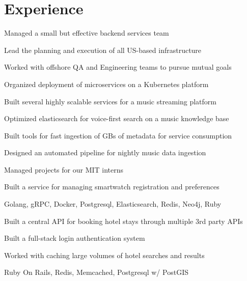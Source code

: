 \documentclass[]{modern}
\begin{document}
\begin{minipage}[t]{0.66\textwidth}


\section{Experience}


\vspace{\topsep} %
\begin{tightemize}
\item Managed a small but effective backend services team
\item Lead the planning and execution of all US-based infrastructure
\item Worked with offshore QA and Engineering teams to pursue mutual goals
\item Organized deployment of microservices on a Kubernetes platform
\end{tightemize}
\sectionsep


\begin{tightemize}
\item Built several highly scalable services for a music streaming platform
\item Optimized elasticsearch for voice-first search on a music knowledge base
\item Built tools for fast ingestion of GBs of metadata for service consumption
\item Designed an automated pipeline for nightly music data ingestion
\item Managed projects for our MIT interns
\item Built a service for managing smartwatch registration and preferences
\item Golang, gRPC, Docker, Postgresql, Elasticsearch, Redis, Neo4j, Ruby
\end{tightemize}
\sectionsep


\begin{tightemize}
\item Built a central API for booking hotel stays through multiple 3rd party APIs
\item Built a full-stack login authentication system
\item Worked with caching large volumes of hotel searches and results
\item Ruby On Rails, Redis, Memcached, Postgresql w/ PostGIS
\end{tightemize}
\sectionsep


\end{minipage}
\end{document}
